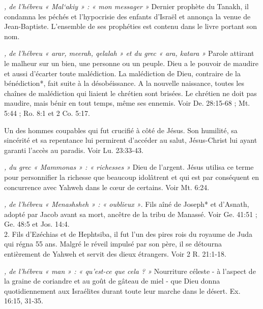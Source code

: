 \begin{multicols}{2}
{\textit{, de l'hébreu « Mal`akiy » : « mon messager »}\newline
Dernier prophète du Tanakh, il condamna les péchés et l'hypocrisie des enfants d'Israël et annonça la venue de Jean-Baptiste. L'ensemble de ses prophéties est contenu dans le livre portant son nom.

\textit{, de l'hébreu « arar, meerah, qelalah » et du grec « ara, katara »}\newline
Parole attirant le malheur sur un bien, une personne ou un peuple. Dieu a le pouvoir de maudire et aussi d'écarter toute malédiction. La malédiction de Dieu, contraire de la bénédiction*, fait suite à la désobéissance. A la nouvelle naissance, toutes les chaînes de malédiction qui liaient le chrétien sont brisées. Le chrétien ne doit pas maudire, mais bénir en tout temps, même ses ennemis. Voir De. 28:15-68 ; Mt. 5:44 ; Ro. 8:1 et 2 Co. 5:17.

\textit{}\newline
Un des hommes coupables qui fut crucifié à côté de Jésus. Son humilité, sa sincérité et sa repentance lui permirent d'accéder au salut, Jésus-Christ lui ayant garanti l'accès au paradis. Voir Lu. 23:33-43.

\textit{, du grec « Mammonas » : « richesses »}\newline
Dieu de l'argent. Jésus utilisa ce terme pour personnifier la richesse que beaucoup idolâtrent et qui est par conséquent en concurrence avec Yahweh dans le cœur de certains. Voir Mt. 6:24.

\textit{, de l'hébreu « Menashsheh » : « oublieux »}. Fils aîné de Joseph* et d'Asnath, adopté par Jacob avant sa mort, ancêtre de la tribu de Manassé. Voir Ge. 41:51 ; Ge. 48:5 et Jos. 14:4.
\\2. Fils d'Ezéchias et de Hephtsiba, il fut l'un des pires rois du royaume de Juda qui régna 55 ans. Malgré le réveil impulsé par son père, il se détourna entièrement de Yahweh et servit des dieux étrangers. Voir 2 R. 21:1-18.

\textit{, de l'hébreu « man » : « qu'est-ce que cela ? »}\newline
Nourriture céleste - à l'aspect de la graine de coriandre et au goût de gâteau de miel - que Dieu donna quotidiennement aux Israélites durant toute leur marche dans le désert. Ex. 16:15, 31-35.

}
\end{multicols}
